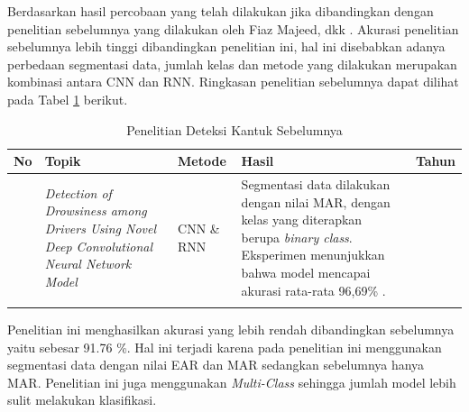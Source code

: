     
        
        
    Berdasarkan hasil percobaan yang telah dilakukan jika dibandingkan
     dengan penelitian sebelumnya yang dilakukan oleh Fiaz Majeed, dkk \cite{majeed2023detection}. Akurasi penelitian sebelumnya lebih tinggi dibandingkan penelitian ini, hal ini disebabkan adanya perbedaan segmentasi data, jumlah kelas dan metode yang dilakukan merupakan kombinasi antara CNN dan RNN. Ringkasan penelitian sebelumnya dapat dilihat pada Tabel \ref{Penelitian lama} berikut. 


    \begin{table}[H]
        \centering
        \caption{Penelitian Deteksi Kantuk Sebelumnya \cite{majeed2023detection}}
         \label{Penelitian lama}
        \begin{tabular}%
              {  >{\raggedright\arraybackslash}p{0.5cm} 
        >{\raggedright\arraybackslash}p{3 cm} 
        >{\raggedright\arraybackslash}p{2cm} 
        >{\raggedright\arraybackslash}p{5.0cm} 
        >{\raggedright\arraybackslash}p{1.0cm}}
    
            \hline
            \textbf{No}  & \textbf{Topik} &\textbf{ Metode} & \textbf{Hasil} & \textbf{Tahun} \\
            
            \hline
             1 
            &
            \textit{Detection of Drowsiness among Drivers Using Novel Deep Convolutional Neural Network Model}
            & 
            CNN \& RNN
            &
            
             Segmentasi data dilakukan dengan nilai MAR, dengan kelas yang diterapkan berupa \textit{binary class}. Eksperimen menunjukkan bahwa model mencapai akurasi rata-rata 96,69\% .
            &
            2023 \\   
            \\

             \hline

        \end{tabular}
    \end{table}


    Penelitian ini menghasilkan akurasi yang lebih rendah dibandingkan sebelumnya yaitu sebesar 91.76 \%. Hal ini terjadi karena pada penelitian ini menggunakan segmentasi data dengan nilai EAR dan MAR sedangkan sebelumnya hanya MAR. Penelitian ini juga menggunakan \textit{Multi-Class} sehingga jumlah model lebih sulit melakukan klasifikasi.

